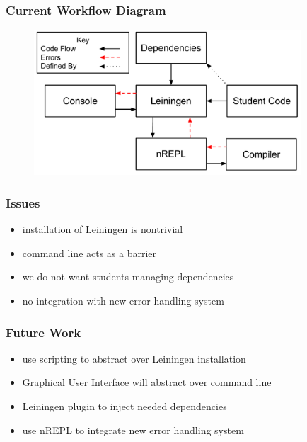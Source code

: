 \documentclass{beamer}
\begin{document}

\begin{frame}[fragile]
\frametitle{Current Workflow Diagram}
\begin{figure}[h]
 \includegraphics[width=10cm]{../CurrentErrorHandling.pdf}
 \centering
\end{figure}
\end{frame}

\begin{frame}
\frametitle{Issues}
	\begin{itemize}
		\item installation of Leiningen is nontrivial
		\item command line acts as a barrier
		\item we do not want students managing dependencies
		\item no integration with new error handling system
	\end{itemize} 
\end{frame}

\begin{frame}
\frametitle{Future Work}
	\begin{itemize}
		\item use scripting to abstract over Leiningen installation
		\item Graphical User Interface will abstract over command line
		\item Leiningen plugin to inject needed dependencies
		\item use nREPL to integrate new error handling system
	\end{itemize}
\end{frame}
\end{document}
